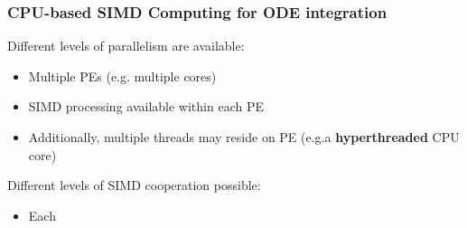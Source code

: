 \documentclass{beamer}
\begin{document}
    
\begin{frame}
 \frametitle{CPU-based SIMD Computing for ODE integration}
 Different levels of parallelism are available:
 \begin{itemize}
  \item Multiple PEs (e.g. multiple cores)
  \item SIMD processing available within each PE
  \item Additionally, multiple threads may reside on PE (e.g.a \textbf{hyperthreaded} CPU core)
 \end{itemize}
 Different levels of SIMD cooperation possible:
 \begin{itemize}
  \item Each 
 \end{itemize}

\end{frame}
\end{document}
